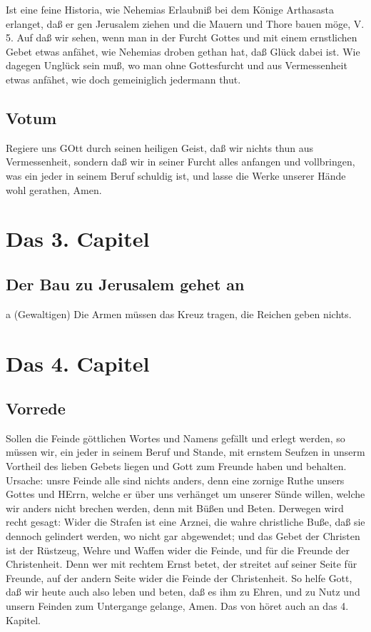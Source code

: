 Ist eine feine Historia, wie Nehemias Erlaubniß bei dem Könige Arthasasta erlanget, daß er gen Jerusalem ziehen und die Mauern und Thore bauen möge, V. 5. Auf daß wir sehen, wenn man in der Furcht Gottes und mit einem ernstlichen Gebet etwas anfähet, wie Nehemias droben gethan hat, daß Glück dabei ist. Wie dagegen Unglück sein muß, wo man ohne Gottesfurcht und aus Vermessenheit etwas anfähet, wie doch gemeiniglich jedermann thut.

\section{Votum}

Regiere uns GOtt durch seinen heiligen Geist, daß wir nichts thun aus Vermessenheit, sondern daß wir in seiner Furcht alles anfangen und vollbringen, was ein jeder in seinem Beruf schuldig ist, und lasse die Werke unserer Hände wohl gerathen, Amen.

\chapter{Das 3. Capitel}

\section{Der Bau zu Jerusalem gehet an}

a (Gewaltigen) Die Armen müssen das Kreuz tragen, die Reichen geben nichts.


\chapter{Das 4. Capitel}

\section{Vorrede}

Sollen die Feinde göttlichen Wortes und Namens gefällt und erlegt werden, so müssen wir, ein jeder in seinem Beruf und Stande, mit ernstem Seufzen in unserm Vortheil des lieben Gebets liegen und Gott zum Freunde haben und behalten. Ursache: unsre Feinde alle sind nichts anders, denn eine zornige Ruthe unsers Gottes und HErrn, welche er über uns verhänget um unserer Sünde willen, welche wir anders nicht brechen werden, denn mit Büßen und Beten. Derwegen wird recht gesagt: Wider die Strafen ist eine Arznei, die wahre christliche Buße, daß sie dennoch gelindert werden, wo nicht gar abgewendet; und das Gebet der Christen ist der Rüstzeug, Wehre und Waffen wider die Feinde, und für die Freunde der Christenheit. Denn wer mit rechtem Ernst betet, der streitet auf seiner Seite für Freunde, auf der andern Seite wider die Feinde der Christenheit. So helfe Gott, daß wir heute auch also leben und beten, daß es ihm zu Ehren, und zu Nutz und unsern Feinden zum Untergange gelange, Amen. Das von höret auch an das 4. Kapitel.

